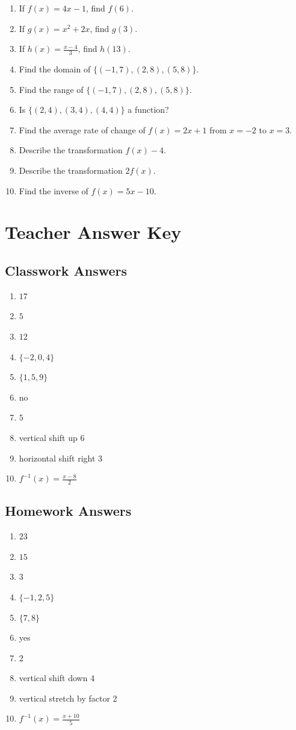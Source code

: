 \documentclass[11pt]{book}
\begin{document}
\begin{enumerate}
\item If \(f(x)=4x-1\), find \(f(6)\).
\item If \(g(x)=x^2+2x\), find \(g(3)\).
\item If \(h(x)=\frac{x-4}{3}\), find \(h(13)\).
\item Find the domain of \(\{(-1,7),(2,8),(5,8)\}\).
\item Find the range of \(\{(-1,7),(2,8),(5,8)\}\).
\item Is \(\{(2,4),(3,4),(4,4)\}\) a function?
\item Find the average rate of change of \(f(x)=2x+1\) from \(x=-2\) to \(x=3\).
\item Describe the transformation \(f(x)-4\).
\item Describe the transformation \(2f(x)\).
\item Find the inverse of \(f(x)=5x-10\).
\end{enumerate}

\section{Teacher Answer Key}

\subsection{Classwork Answers}

\begin{enumerate}
\item \(17\)
\item \(5\)
\item \(12\)
\item \(\{-2,0,4\}\)
\item \(\{1,5,9\}\)
\item no
\item \(5\)
\item vertical shift up 6
\item horizontal shift right 3
\item \(f^{-1}(x)=\frac{x-8}{2}\)
\end{enumerate}

\subsection{Homework Answers}

\begin{enumerate}
\item \(23\)
\item \(15\)
\item \(3\)
\item \(\{-1,2,5\}\)
\item \(\{7,8\}\)
\item yes
\item \(2\)
\item vertical shift down 4
\item vertical stretch by factor 2
\item \(f^{-1}(x)=\frac{x+10}{5}\)
\end{enumerate}
\end{document}
